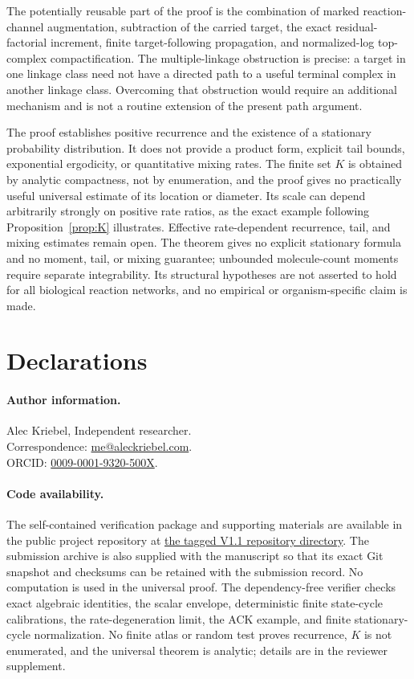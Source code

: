 The potentially reusable part of the proof is the combination of marked
reaction-channel augmentation, subtraction of the carried target, the exact
residual-factorial increment, finite target-following propagation, and
normalized-log top-complex compactification.  The multiple-linkage obstruction
is precise: a target in one linkage class need not have a directed path to a
useful terminal complex in another linkage class.  Overcoming that obstruction
would require an additional mechanism and is not a routine extension of the
present path argument.

The proof establishes positive recurrence and the existence of a stationary
probability distribution.  It does not provide a product form, explicit tail
bounds, exponential ergodicity, or quantitative mixing rates.  The finite set
\(K\) is obtained by analytic compactness, not by enumeration, and the proof
gives no practically useful universal estimate of its location or diameter.
Its scale can depend arbitrarily strongly on positive rate ratios, as the
exact example following Proposition~\ref{prop:K} illustrates.  Effective
rate-dependent recurrence, tail, and mixing estimates remain open.
The theorem gives no explicit stationary formula and no moment, tail, or
mixing guarantee; unbounded molecule-count moments require separate
integrability.  Its structural hypotheses are not asserted to hold for all
biological reaction networks, and no empirical or organism-specific claim is
made.

\section*{Declarations}

\paragraph{Author information.}
Alec Kriebel, Independent researcher.\\
Correspondence: \mbox{\href{mailto:me@aleckriebel.com}{me@aleckriebel.com}}.\\
ORCID: \href{https://orcid.org/0009-0001-9320-500X}{0009-0001-9320-500X}.

\paragraph{Code availability.}
The self-contained verification package and supporting materials are
available in the public project repository at
\href{https://github.com/AlecKriebel/Math/tree/bimolecular-positive-recurrence-v1.1/bimolecular_positive_recurrence_submission_v1_1}{the tagged V1.1 repository directory}.
The submission archive is also supplied with the manuscript so that its exact
Git snapshot and checksums can be retained with the submission record.  No
computation is used in the universal proof.  The dependency-free verifier
checks exact algebraic identities, the scalar envelope, deterministic finite
state-cycle calibrations, the rate-degeneration limit, the ACK example, and
finite stationary-cycle normalization.  No finite atlas or random test proves
recurrence, \(K\) is not enumerated, and the universal theorem is analytic;
details are in the reviewer supplement.

